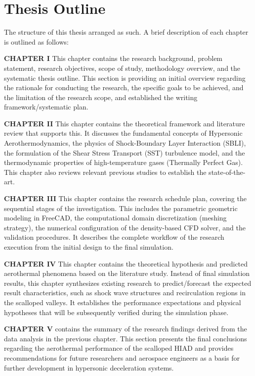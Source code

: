 \section{Thesis Outline}
The  structure of this thesis arranged as such. A brief description of each chapter is outlined as follows:

\textbf{CHAPTER I} This chapter contains the research background, problem statement, research objectives, scope of study, methodology overview, and the systematic thesis outline. This section is providing an initial overview regarding the rationale for conducting the research, the specific goals to be achieved, and the limitation of the research scope, and established the writing framework/systematic plan.

\textbf{CHAPTER II} This chapter contains the theoretical framework and literature review that supports this. It discusses the fundamental concepts of Hypersonic Aerothermodynamics, the physics of Shock-Boundary Layer Interaction (SBLI), the formulation of the Shear Stress Transport (SST) turbulence model, and the thermodynamic properties of high-temperature gases (Thermally Perfect Gas). This chapter also reviews relevant previous studies to establish the state-of-the-art.

\textbf{CHAPTER III} This chapter contains the research schedule plan, covering the sequential stages of the investigation. This includes the parametric geometric modeling in FreeCAD, the computational domain discretization (meshing strategy), the numerical configuration of the density-based CFD solver, and the validation procedures. It describes the complete workflow of the research execution from the initial design to the final simulation.

\textbf{CHAPTER IV} This chapter contains the theoretical hypothesis and predicted aerothermal phenomena based on the literature study. Instead of final simulation results, this chapter synthesizes existing research to predict/forecast the expected result characteristics, such as shock wave structures and recirculation regions in the scalloped valleys. It establishes the performance expectations and physical hypotheses that will be subsequently verified during the simulation phase.

\textbf{CHAPTER V} contains the summary of the research findings derived from the data analysis in the previous chapter. This section presents the final conclusions regarding the aerothermal performance of the scalloped HIAD and provides recommendations for future researchers and aerospace engineers as a basis for further development in hypersonic deceleration systems.
